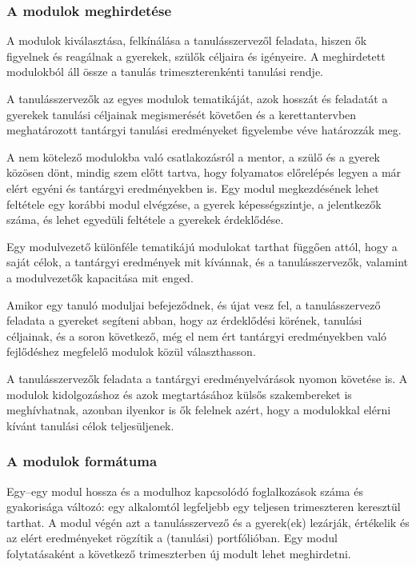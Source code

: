\subsubsection{A modulok meghirdetése}

A modulok kiválasztása, felkínálása a tanulásszervezől feladata,
hiszen ők figyelnek és reagálnak a gyerekek, szülők céljaira és igényeire. A
meghirdetett modulokból áll össze a tanulás trimeszterenkénti tanulási rendje.

A tanulásszervezők az egyes modulok tematikáját, azok hosszát és feladatát a
gyerekek tanulási céljainak megismerését követően és a kerettantervben
meghatározott tantárgyi tanulási eredményeket figyelembe véve határozzák meg.

A nem kötelező modulokba való csatlakozásról a mentor, a szülő és a gyerek
közösen dönt,
mindig szem előtt tartva, hogy folyamatos előrelépés legyen a már elért egyéni
és tantárgyi eredményekben is. Egy modul megkezdésének lehet feltétele egy
korábbi modul elvégzése, a gyerek képességszintje, a jelentkezők száma, és
lehet egyedüli feltétele a gyerekek érdeklődése.

Egy modulvezető különféle tematikájú modulokat tarthat függően attól, hogy a
saját célok, a tantárgyi eredmények mit kívánnak, és a tanulásszervezők,
valamint a modulvezetők kapacitása mit enged.

Amikor egy tanuló moduljai befejeződnek, és újat vesz fel, a tanulásszervező
feladata a gyereket segíteni abban, hogy az érdeklődési körének, tanulási
céljainak, és a soron következő, még el nem ért tantárgyi eredményekben való
fejlődéshez megfelelő modulok közül választhasson.

A tanulásszervezők feladata a tantárgyi eredményelvárások nyomon követése is. A
modulok kidolgozáshoz és azok megtartásához külsős szakembereket is
meghívhatnak, azonban ilyenkor is ők felelnek azért, hogy a modulokkal elérni
kívánt tanulási célok teljesüljenek.

\subsubsection{A modulok formátuma}

Egy--egy modul hossza és a modulhoz kapcsolódó foglalkozások száma és
gyakorisága változó: egy alkalomtól legfeljebb egy teljesen trimeszteren
keresztül tarthat. A modul végén azt a tanulásszervező és a gyerek(ek)
lezárják, értékelik és az elért eredményeket rögzítik a (tanulási)
portfólióban. Egy modul folytatásaként a következő trimeszterben új modult
lehet meghirdetni.

